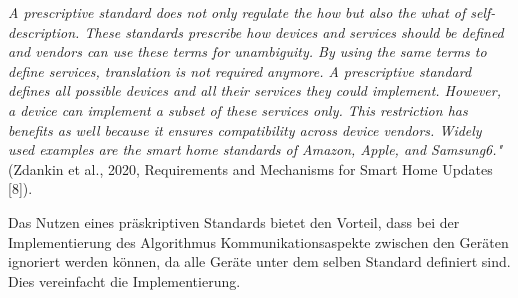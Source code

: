 \textit{
A prescriptive standard does not only regulate the how but also the what of self-description.
These standards prescribe how devices and services should be defined and vendors can use
these terms for unambiguity. By using the same terms to define services, translation is not
required anymore. A prescriptive standard defines all possible devices and all their services
they could implement. However, a device can implement a subset of these services only.
This restriction has benefits as well because it ensures compatibility across device vendors.
Widely used examples are the smart home standards of Amazon, Apple, and Samsung6."}
(Zdankin et al., 2020, Requirements and Mechanisms for Smart Home Updates [8]).

Das Nutzen eines präskriptiven Standards bietet den Vorteil, dass bei der Implementierung des Algorithmus Kommunikationsaspekte
zwischen den Geräten ignoriert werden können, da alle Geräte unter dem selben Standard definiert sind. Dies vereinfacht die Implementierung. 


